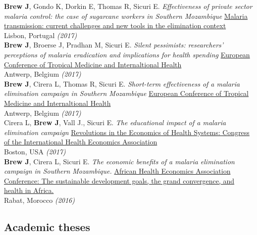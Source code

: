 \documentclass[11pt]{article}
\begin{document}
\noindent \textbf{Brew J}, Gondo K, Dorkin E, Thomas R, Sicuri E. \emph{Effectiveness of private sector malaria control: the case of sugarcane workers in Southern Mozambique} \href{http://www.ihmt.unl.pt/en/workshop-malaria-transmission-en/}{Malaria transmission: current challenges and new tools in the elimination context} \\
Lisbon, Portugal \hfill \emph{(2017)}\\

\noindent \textbf{Brew J}, Broerse J, Pradhan M, Sicuri E. \emph{Silent pessimists: researchers' perceptions of malaria eradication and implications for health spending} \href{http://www.ectmih2017.be/}{European Conference of Tropical Medicine and Internaltional Health} \\
Antwerp, Belgium \hfill \emph{(2017)}\\

\noindent \textbf{Brew J}, Cirera L, Thomas R, Sicuri E. \emph{Short-term effectiveness of a malaria elimination campaign in Southern Mozambique} \href{http://www.ectmih2017.be/}{European Conference of Tropical Medicine and Internaltional Health} \\
Antwerp, Belgium \hfill \emph{(2017)}\\

\noindent Cirera L, \textbf{Brew J}, Vall J., Sicuri E. \emph{The educational impact of a malaria elimination campaign} \href{https://www.healtheconomics.org/page/BostonCongress2017}{Revolutions in the Economics of Health Systems: Congress of the International Health Economics Association} \\
Boston, USA \hfill \emph{(2017)}\\


\noindent \textbf{Brew J}, Cirera L, Sicuri E. \emph{The economic benefits of a malaria elimination campaign in Southern Mozambique.} \href{http://afhea.org/en/conferences/conference-2016-rabat}{African Health Economics Association Conference: The sustainable development goals, the grand convergence, and health in Africa.} \\
Rabat, Morocco \hfill \emph{(2016)}\\



\subsection*{Academic theses}
\end{document}
